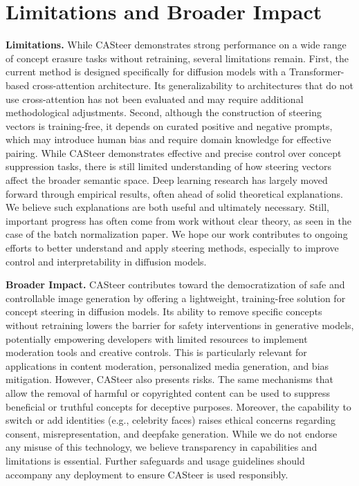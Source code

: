\clearpage

\appendix



\tableofcontents

\clearpage

\section{Limitations and Broader Impact}

\textbf{Limitations. } While CASteer demonstrates strong performance on a wide range of concept erasure tasks without retraining, several limitations remain. First, the current method is designed specifically for diffusion models with a Transformer-based cross-attention architecture. Its generalizability to architectures that do not use cross-attention has not been evaluated and may require additional methodological adjustments. 
%
Second, although the construction of steering vectors is training-free, it depends on curated positive and negative prompts, which may introduce human bias and require domain knowledge for effective pairing. 
%
%
While CASteer demonstrates effective and precise control over concept suppression tasks, there is still limited understanding of how steering vectors affect the broader semantic space. Deep learning research has largely moved forward through empirical results, often ahead of solid theoretical explanations. We believe such explanations are both useful and ultimately necessary. Still, important progress has often come from work without clear theory, as seen in the case of the batch normalization paper. We hope our work contributes to ongoing efforts to better understand and apply steering methods, especially to improve control and interpretability in diffusion models. 


\textbf{Broader Impact. } CASteer contributes toward the democratization of safe and controllable image generation by offering a lightweight, training-free solution for concept steering in diffusion models. Its ability to remove specific concepts without retraining lowers the barrier for safety interventions in generative models, potentially empowering developers with limited resources to implement moderation tools and creative controls. This is particularly relevant for applications in content moderation, personalized media generation, and bias mitigation. However, CASteer also presents risks. The same mechanisms that allow the removal of harmful or copyrighted content can be used to suppress beneficial or truthful concepts for deceptive purposes. Moreover, the capability to switch or add identities (e.g., celebrity faces) raises ethical concerns regarding consent, misrepresentation, and deepfake generation. While we do not endorse any misuse of this technology, we believe transparency in capabilities and limitations is essential. Further safeguards and usage guidelines should accompany any deployment to ensure CASteer is used responsibly.

